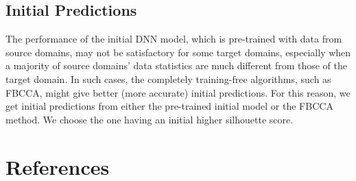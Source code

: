 \documentclass[12pt]{iopart}
\begin{document}
\subsection{Initial Predictions}
The performance of the initial DNN model, which is pre-trained with data from source domains, may not be satisfactory for some target domains, especially when a majority of source domains' data statistics are much different from those of the target domain. In such cases, the completely training-free algorithms, such as FBCCA, might give better (more accurate) initial predictions. For this reason, we get initial predictions from either the pre-trained initial model or the FBCCA method. We choose the one having an initial higher silhouette score.


\section*{References}


 
\end{document}
